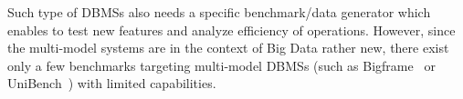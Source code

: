 Such type of DBMSs also needs a specific benchmark/data generator which enables to test new features and analyze efficiency of operations. However, since the multi-model systems are in the context of Big Data rather new, there exist only a few benchmarks targeting multi-model DBMSs (such as Bigframe~\cite{journals/pvldb/KunjirKB14} or UniBench~\cite{conf/cidr/lu17}) with limited capabilities.

